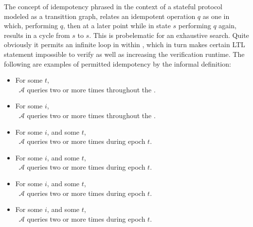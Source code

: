 The concept of idempotency phrased in the context of a stateful protocol modeled as a transittion graph, relates an idempotent operation \(q\) as one in which, performing \(q\), then at a later point while in state \(s\) performing \(q\) again, results in a cycle from \(s\) to \(s\).
This is probelematic for an exhaustive search.
Quite obviously it permits an infinite loop in within \CGKAmod, which in turn makes certain LTL statement impossible to verify as well as increasing the verification runtime.
The following are examples of permitted idempotency by the informal \CGKAsec definition:

\begin{itemize}
  \item For some \(t\),\\~\hspace{4em}\(\mathcal{A}\) queries     two or more times throughout the \CGKAsec.  
  \item For some \(i\),\\~\hspace{4em}\(\mathcal{A}\) queries  two or more times throughout the \CGKAsec.
  \item For some \(i\), and some \(t\),\\~\hspace{4em}\(\mathcal{A}\) queries         two or more times during epoch \(t\).
  \item For some \(i\), and some \(t\),\\~\hspace{4em}\(\mathcal{A}\) queries     two or more times during epoch \(t\).
  \item For some \(i\), and some \(t\),\\~\hspace{4em}\(\mathcal{A}\) queries  two or more times during epoch \(t\).
  \item For some \(i\), and some \(t\),\\~\hspace{4em}\(\mathcal{A}\) queries  two or more times during epoch \(t\).

\end{itemize}

